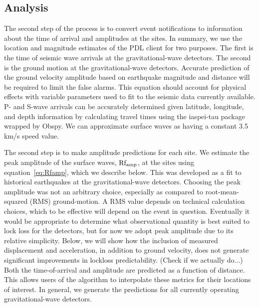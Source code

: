 \documentclass[reprint, prl, aps, showpacs]{revtex4-1}
\newcommand{\rednote}[1]{{\color{red} (#1)}}
\begin{document}
\subsection{Analysis}

The second step of the process is to convert event notifications to information about the time of arrival and amplitudes at the sites.
In summary, we use the location and magnitude estimates of the PDL client for two purposes. 
The first is the time of seismic wave arrivals at the gravitational-wave detectors.
The second is the ground motion at the gravitational-wave detectors.
Accurate prediction of the ground velocity amplitude based on earthquake magnitude and distance will be required to limit the false alarms. 
This equation should account for physical effects with variable parameters used to fit to the seismic data currently available.
P- and S-wave arrivals can be accurately determined given latitude, longitude, and depth information by calculating travel times using the iaspei-tau package \cite{Snoke2009} wrapped by Obspy. We can approximate surface waves as having a constant 3.5\,km/s speed value. 

The second step is to make amplitude predictions for each site. 
We estimate the peak amplitude of the surface waves, $\rm Rf_{amp}$, at the sites using equation~\ref{eq:Rfamp}, which we describe below. This was developed as a fit to historical earthquakes at the gravitational-wave detectors. Choosing the peak amplitude was not an arbitrary choice, especially as compared to root-mean-squared (RMS) ground-motion. A RMS value depends on technical calculation choices, which to be effective will depend on the event in question. Eventually it would be appropriate to determine what observational quantity is best suited to lock loss for the detectors, but for now we adopt peak amplitude due to its relative simplicity. Below, we will show how the inclusion of measured displacement and acceleration, in addition to ground velocity, does not generate significant improvements in lockloss predictability. \rednote{Check if we actually do...} Both the time-of-arrival and amplitude are predicted as a function of distance. This allows users of the algorithm to interpolate these metrics for their locations of interest. In general, we generate the predictions for all currently operating gravitational-wave detectors.
\end{document}

